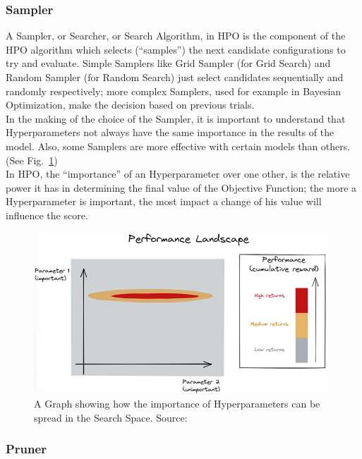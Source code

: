 \subsubsection{Sampler}

A Sampler, or Searcher, or Search Algorithm, in HPO is the component of the HPO algorithm which selects (“samples”) the next candidate configurations to try and evaluate.
Simple Samplers like Grid Sampler (for Grid Search) and Random Sampler (for Random Search) just select candidates sequentially and randomly respectively; more complex Samplers, used for example in Bayesian Optimization, make the decision based on previous trials.
\\[0.3cm]In the making of the choice of the Sampler, it is important to understand that Hyperparameters not always have the same importance in the results of the model. Also, some Samplers are more effective with certain models than others. (See Fig.~\ref{fig:figure-2.1.1})
\\[0.3cm]In HPO, the “importance” of an Hyperparameter over one other, is the relative power it has in determining the final value of the Objective Function; the more a Hyperparameter is important, the most impact a change of his value will influence the score.
\begin{figure}[t]
	\centering
	\includegraphics[width=11cm]{figures/figure-2.1.1.png}
	\caption[Hyperparameters Importance]{A Graph showing how the importance of Hyperparameters can be spread in the Search Space. Source:~\cite{Tesi-1.3}}
	\label{fig:figure-2.1.1}
\end{figure}

\subsubsection{Pruner}

